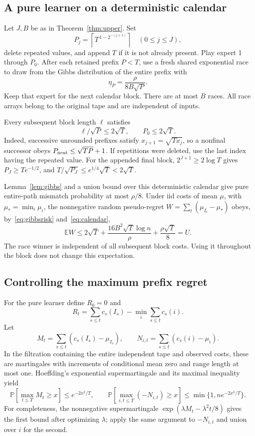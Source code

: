 \documentclass[11pt]{article}
\newcommand{\E}{\mathbb E}
\newcommand{\Prob}{\mathbb P}
\newcommand{\1}{\mathbf 1}
\begin{document}
\subsection{A pure learner on a deterministic calendar}

Let $J,B$ be as in Theorem~\ref{thm:upper}. Set
\[
 P_j=\left\lceil T^{\,1-2^{-(j+1)}}\right\rceil
       \quad(0\le j\le J),
\]
delete repeated values, and append $T$ if it is not already present.
Play expert 1 through $P_0$. After each retained prefix $P<T$,
use a fresh shared exponential race to draw from the Gibbs distribution
of the entire prefix with
\[
 \eta_P=\frac{\rho}{8B\sqrt P}.
\]
Keep that expert for the next calendar block. There are at most $B$
races. All race arrays belong to the original tape and are independent
of inputs.

Every subsequent block length $\ell$ satisfies
\begin{equation}\label{eq:calendar}
 \ell/\sqrt P\le2\sqrt T,\qquad P_0\le2\sqrt T.
\end{equation}
Indeed, successive unrounded prefixes satisfy
$x_{j+1}=\sqrt{Tx_j}$, so a nonfinal successor obeys
$P_{\rm next}\le\sqrt{TP}+1$. If repetitions were deleted, use the
last index having the repeated value. For the appended final block,
$2^{J+1}\ge2\log T$ gives $P_J\ge Te^{-1/2}$, and
$T/\sqrt{P_J}\le e^{1/4}\sqrt T<2\sqrt T$.

Lemma~\ref{lem:gibbs} and a union bound over this deterministic
calendar give pure entire-path mismatch probability at most $\rho/8$.
Under iid costs of mean $\mu$, with $\mu_*=\min_i\mu_i$, the
nonnegative random pseudo-regret
$W=\sum_t(\mu_{I_t}-\mu_*)$ obeys, by~\eqref{eq:gibbsrisk}
and~\eqref{eq:calendar},
\begin{equation}\label{eq:pseudoreg}
 \E W\le
 2\sqrt T+\frac{16B^2\sqrt T\log n}{\rho}
          +\frac{\rho\sqrt T}{8}=U .
\end{equation}
The race winner is independent of all subsequent block costs.
Using it throughout the block does not change this expectation.

\subsection{Controlling the maximum prefix regret}

For the pure learner define $R_0=0$ and
\[
 R_t=\sum_{s\le t}c_s(I_s)-\min_i\sum_{s\le t}c_s(i).
\]
Let
\[
 M_t=\sum_{s\le t}(c_s(I_s)-\mu_{I_s}),\qquad
 N_{i,t}=\sum_{s\le t}(c_s(i)-\mu_i).
\]
In the filtration containing the entire independent tape and observed
costs, these are martingales with increments of conditional mean zero
and range length at most one. Hoeffding's exponential supermartingale
and its maximal inequality yield
\[
 \Prob\!\left[\max_{t\le T}M_t\ge x\right]\le e^{-2x^2/T},\qquad
 \Prob\!\left[\max_{i,t\le T}(-N_{i,t})\ge x\right]
 \le\min\{1,ne^{-2x^2/T}\}.
\]
For completeness, the nonnegative supermartingale
$\exp(\lambda M_t-\lambda^2t/8)$ gives the first bound after
optimizing $\lambda$; apply the same argument to $-N_{i,t}$
and union over $i$ for the second.
\end{document}

